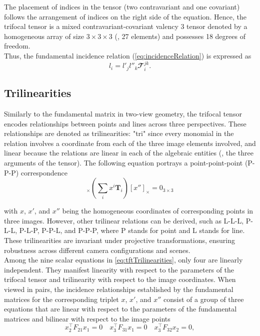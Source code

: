 The placement of indices in the tensor (two contravariant and one covariant) follows the arrangement of indices on the right side of the equation. Hence, the trifocal tensor is a mixed contravariant-covariant valency 3 tensor denoted by a homogeneous array of size \( 3 \times 3 \times 3 \) (\ie, 27 elements) and possesses 18 degrees of freedom.\\

Thus, the fundamental incidence relation (\ref{eq:incidenceRelation}) is expressed as
\begin{equation}
	l_i = l'_jl''_k\mathbfcal{T}_i^{jk}.
	\label{eq:incidenceRelationTensor}
\end{equation}

\subsection{Trilinearities}\label{sec:trilinearities}
Similarly to the fundamental matrix in two-view geometry, the trifocal tensor encodes relationships between points and lines across three perspectives. These relationships are denoted as trilinearities: "tri" since every monomial in the relation involves a coordinate from each of the three image elements involved, and linear because the relations are linear in each of the algebraic entities (\ie, the three arguments of the tensor). The following equation portrays a point-point-point (P-P-P) correspondence 
\begin{equation}
	[x']_{\times} \left( \sum_{i}x^i\bm{T}_i \right) [x'']_{\times} = 0_{3 \times 3}
	\label{eq:tftTrilinearities}
\end{equation}

with \( x \), \( x' \), and \( x'' \) being the homogeneous coordinates of corresponding points in three images. However, other trilinear relations can be derived, such as L-L-L, P-L-L, P-L-P, P-P-L, and P-P-P, where P stands for point and L stands for line. These trilinearities are invariant under projective transformations, ensuring robustness across different camera configurations and scenes.\\

Among the nine scalar equations in \ref{eq:tftTrilinearities}, only four are linearly independent. They manifest linearity with respect to the parameters of the trifocal tensor and trilinearity with respect to the image coordinates. When viewed in pairs, the incidence relationships established by the fundamental matrices for the corresponding triplet \( x \), \( x' \), and \( x'' \) consist of a group of three equations that are linear with respect to the parameters of the fundamental matrices and bilinear with respect to the image points
\begin{equation}
	x_2^\top F_{21}x_1 = 0 \quad x_3^\top F_{31}x_1 = 0 \quad x_3^\top F_{32}x_2 = 0,
\end{equation}


